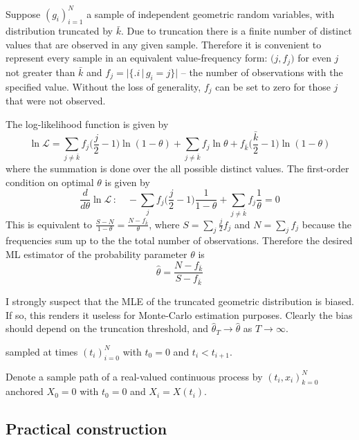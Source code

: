 \documentclass[a4paper]{report}
\begin{document}
Suppose ${(g_i)}_{i=1}^N$ a sample of independent geometric random variables, with distribution truncated by $\bar{k}$. Due to truncation there is a finite number of distinct values that are observed in any given sample. Therefore it is convenient to represent every sample in an equivalent value-frequency form: ${\Big(j, f_j\Big)}$ for even $j$ not greater than $\bar{k}$ and 
$f_j = \bigg\lvert\big\{\big.i\,\big\rvert\,g_i=j\big\}\bigg\rvert$ -- the number of observations with the specified value. Without the loss of generality, $f_j$ can be set to zero for those $j$ that were not observed.

The log-likelihood function is given by
$$\ln\mathcal{L} = \sum_{j\neq \bar{k}} f_j {\Big(\frac{j}{2}-1\Big)} \ln {(1-\theta)} + \sum_{j\neq \bar{k}} f_j \ln \theta + f_{\bar{k}} {\Big(\frac{\bar{k}}{2} - 1\Big)} \ln {(1-\theta)}$$
where the summation is done over the all possible distinct values. The first-order condition on optimal $\theta$ is given by
$$\frac{d}{d \theta} \ln\mathcal{L}\,:\quad-\sum_j f_j {\Big(\frac{j}{2}-1\Big)} \frac{1}{1-\theta} + \sum_{j\neq \bar{k}} f_j \frac{1}{\theta} = 0$$
This is equivalent to $\frac{S-N}{1-\theta} = \frac{N-f_{\bar{k}}}{\theta}$, where $S = \sum_j \frac{j}{2} f_j$ and $N = \sum_j f_j$ because the frequencies sum up to the the total number of observations. Therefore the desired ML estimator of the probability parameter $\theta$ is
$$\hat{\theta} = \frac{N-f_{\bar{k}}}{S-f_{\bar{k}}}$$

I strongly suspect that the MLE of the truncated geometric distribution is biased. If so, this renders it useless for Monte-Carlo estimation purposes. Clearly the bias should depend on the truncation threshold, and $\hat{\theta}_T \to \hat{\theta}$ as $T\to \infty$.



sampled at times $(t_i)_{i=0}^N$ with $t_0=0$ and $t_i<t_{i+1}$.

Denote a sample path of a real-valued continuous process by ${(t_i, x_i)}_{k=0}^N$
anchored $X_0 = 0$ with $t_0 = 0$ and $X_i = X(t_i)$.


\subsection{Practical construction} %
\label{sub:practical_construction}

\end{document}
